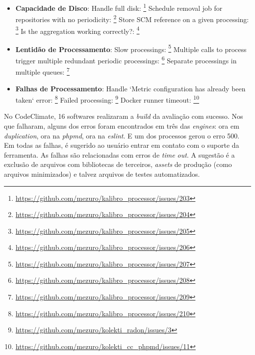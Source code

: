 \begin{itemize}
  \item \textbf{Capacidade de Disco}:
    \subitem Handle full disk: \footnote{\url{https://github.com/mezuro/kalibro\_processor/issues/203}}
    \subitem Schedule removal job for repositories with no periodicity: \footnote{\url{https://github.com/mezuro/kalibro\_processor/issues/204}}
    \subitem Store SCM reference on a given processing: \footnote{\url{https://github.com/mezuro/kalibro\_processor/issues/205}}
    \subitem Is the aggregation working correctly?: \footnote{\url{https://github.com/mezuro/kalibro\_processor/issues/206}}
  \item \textbf{Lentidão de Processamento}:
    \subitem Slow processings: \footnote{\url{https://github.com/mezuro/kalibro\_processor/issues/207}}
    \subitem Multiple calls to process trigger multiple redundant periodic processings: \footnote{\url{https://github.com/mezuro/kalibro\_processor/issues/208}}
    \subitem Separate processings in multiple queues: \footnote{\url{https://github.com/mezuro/kalibro\_processor/issues/209}}
  \item \textbf{Falhas de Processamento}:
    \subitem Handle `Metric configuration has already been taken` error: \footnote{\url{https://github.com/mezuro/kalibro\_processor/issues/210}}
    \subitem Failed processing: \footnote{\url{https://github.com/mezuro/kolekti\_radon/issues/3}}
    \subitem Docker runner timeout: \footnote{\url{https://github.com/mezuro/kolekti\_cc\_phpmd/issues/11}}
\end{itemize}

No CodeClimate, 16 softwares realizaram a \textit{build} da avaliação com
sucesso. Nos que falharam, alguns dos erros foram encontrados em três das
\textit{engines}: ora em \textit{duplication}, ora na \textit{phpmd}, ora na
\textit{eslint}. E um dos processos gerou o erro 500. Em todas as falhas, é
sugerido ao usuário entrar em contato com o suporte da ferramenta. As falhas
são relacionadas com erros de \textit{time out}. A sugestão é a exclusão de
arquivos com bibliotecas de terceiros, \textit{assets} de produção (como
arquivos minimizados) e talvez arquivos de testes automatizados.

